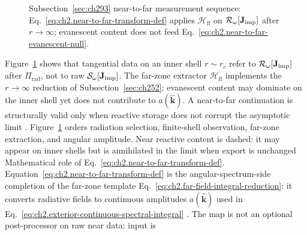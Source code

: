\begin{figure}[t]
\centering
{}
\caption{Subsection~\ref{sec:ch293} near-to-far measurement sequence:
Eq.~\eqref{eq:ch2.near-to-far-transform-def} applies \(\mathcal{H}_{\mathrm{ff}}\) on
\(\mathcal{R}_\omega[\mathbf{J}_{\mathrm{imp}}]\) after \(r\to\infty\); evanescent content does not feed
Eq.~\eqref{eq:ch2.near-to-far-evanescent-null}.}
\label{fig:ch2.near-to-far-measurement chain}
\end{figure}
Figure~\ref{fig:ch2.near-to-far-measurement chain} shows that tangential data on an inner shell
$r\sim r_c$ refer to $\mathcal{R}_\omega[\mathbf{J}_{\mathrm{imp}}]$ after $\Pi_{\mathrm{rad}}$, not to raw
$\mathcal{S}_\omega[\mathbf{J}_{\mathrm{imp}}]$. The far-zone extractor $\mathcal{H}_{\mathrm{ff}}$ implements the
$r\to\infty$ reduction of Subsection~\ref{sec:ch252}; evanescent content may dominate on the inner
shell yet does not contribute to $a(\widehat{\mathbf{k}})$. A near-to-far continuation is
structurally valid only when reactive storage does not corrupt the asymptotic limit
\cite{stratton1941}.
Figure~\ref{fig:ch2.near-to-far-measurement chain} orders radiation selection, finite-shell observation,
far-zone extraction, and angular amplitude. Near reactive content is dashed: it may appear on
inner shells but is annihilated in the limit when export is unchanged
Mathematical role of Eq.~\eqref{eq:ch2.near-to-far-transform-def}. Equation~\eqref{eq:ch2.near-to-far-transform-def} is the angular-spectrum-side completion of the
far-zone template Eq.~\eqref{eq:ch2.far-field-integral-reduction}: it converts radiative fields
to continuous amplitudes \(a(\widehat{\mathbf{k}})\) used in
Eq.~\eqref{eq:ch2.exterior-continuous-spectral-integral} \cite{stratton1941}. The
map is not an optional post-processor on raw near data: input is
